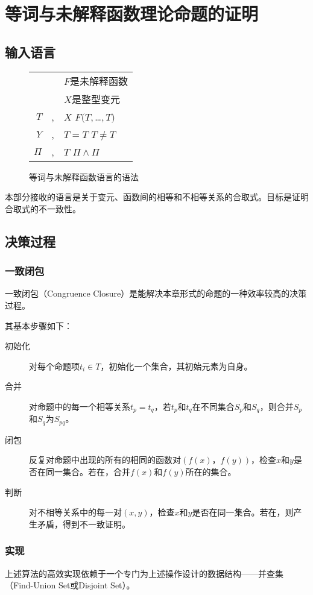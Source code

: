 \chapter{等词与未解释函数理论命题的证明}
\label{chap:euf}

\section{输入语言}
\begin{figure}[!htbp]
  \centering
  \begin{tabular}[rcl]{rcl}
    & & $F$是未解释函数 \\
    & & $X$是整型变元 \\
    $T$ & \sep & $X$ \deli{} $F(T,$\ldots$,T)$ \\
    $Y$ & \sep{} & $T = T$ \deli{} $T \neq T$ \\
    $\Pi$ & \sep{} & $T$ \deli{} $\Pi \land \Pi$ \\
  \end{tabular}
  \caption{等词与未解释函数语言的语法}
  \label{euf:syntax}
\end{figure}
本部分接收的语言是关于变元、函数间的相等和不相等关系的合取式。目标是证明合取式的不一致性。

\section{决策过程}
\subsection{一致闭包}
一致闭包（Congruence Closure）是能解决本章形式的命题的一种效率较高的决策过程。

其基本步骤如下：
\begin{description}
\item[初始化] 对每个命题项$t_i \in T$，初始化一个集合，其初始元素为自身。
\item[合并] 对命题中的每一个相等关系$t_p = t_q$，若$t_p$和$t_q$在不同集合$S_p$和$S_q$，则合并$S_p$和$S_q$为$S_{pq}$。
\item[闭包] 反复对命题中出现的所有的相同的函数对$(f(x)，f(y))$，检查$x$和$y$是否在同一集合。若在，合并$f(x)$和$f(y)$所在的集合。
\item[判断] 对不相等关系中的每一对$(x, y)$，检查$x$和$y$是否在同一集合。若在，则产生矛盾，得到不一致证明。
\end{description}

\subsection{实现}
上述算法的高效实现依赖于一个专门为上述操作设计的数据结构——并查集（Find-Union Set或Disjoint Set）。

